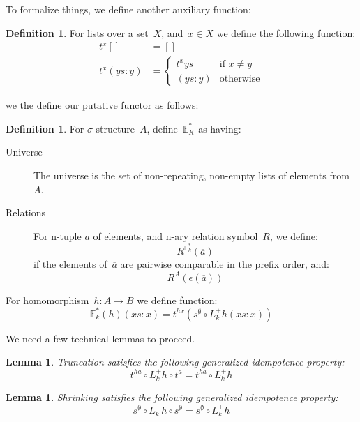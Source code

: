 \documentclass{article}
\theoremstyle{plain}
\newtheorem{lemma}[theorem]{Lemma}
\theoremstyle{definition}
\newtheorem{definition}[theorem]{Definition}
\theoremstyle{remark}
\numberwithin{theorem}{section}
\begin{document}
To formalize things, we define another auxiliary function:
\begin{definition}
For lists over a set~$X$, and~$x \in X$ we define the following function:
\begin{align*}
    t^x [] &= []\\
    t^x (ys:y) &=
    \begin{cases}
    t^x ys &\mbox{if } x \neq y\\
    (ys:y) &\mbox{otherwise}
    \end{cases}
\end{align*}
\end{definition}
we the define our putative functor as follows:
\begin{definition}
For $\sigma$-structure~$A$, define~$\mathbb{E}^*_K$ as having:
\begin{description}
\item[Universe] The universe is the set of non-repeating, non-empty lists of elements from~$A$.
\item[Relations] For n-tuple $\overline{a}$ of elements, and n-ary relation symbol~$R$, we define:
\begin{equation*}
    R^{\mathbb{E}^*_k}(\overline{a})
\end{equation*}
if the elements of~$\overline{a}$ are pairwise comparable in the prefix order, and:
\begin{equation*}
    R^A(\epsilon(\overline{a}))
\end{equation*}
\end{description}
For homomorphism~$h : A \rightarrow B$ we define function:
\begin{equation*}
    \mathbb{E}^*_k(h)(xs:x) = t^{h x}(s^\emptyset \circ L^+_k h (xs:x))
\end{equation*}
\end{definition}
We need a few technical lemmas to proceed.
\begin{lemma}
\label{lem:t-idem}
Truncation satisfies the following generalized idempotence property:
\begin{equation*}
t^{h a} \circ L^+_k h \circ t^a = t^{h a} \circ L^+_k h
\end{equation*}
\end{lemma}
\begin{lemma}
\label{lem:s-idem}
Shrinking satisfies the following generalized idempotence property:
\begin{equation*}
    s^\emptyset \circ L^+_k h \circ s^\emptyset = s^\emptyset \circ L^+_k h
\end{equation*}
\end{lemma}
\end{document}
